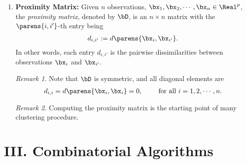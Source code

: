 \documentclass[12pt]{article}
\begin{document}
\begin{enumerate}[label=\textbf{\arabic*.}]
	\item \textbf{Proximity Matrix:} Given $n$ observations, $\bx_1, \bx_2, \cdots, \bx_n \in \Real^p$, the \textit{proximity matrix}, denoted by $\bD$, is an $n \times n$ matrix with the $\parens{i, i'}$-th entry being 
	\begin{align*}
		d_{i,i'} := d \parens{\bx_i, \bx_{i'}}. 
	\end{align*}
	In other words, each entry $d_{i, i'}$ is the pairwise dissimilarities between observations $\bx_i$ and $\bx_{i'}$. 
	
	\textit{Remark 1.} Note that $\bD$ is symmetric, and all diagonal elements are 
	\begin{align*}
		d_{i,i} = d \parens{\bx_i, \bx_i} = 0, \qquad \text{ for all } i = 1, 2, \cdots, n. 
	\end{align*}
	
	\textit{Remark 2.} Computing the proximity matrix is the starting point of many clustering procedure. 
	
\end{enumerate}


\section*{III. Combinatorial Algorithms}
\end{document}

